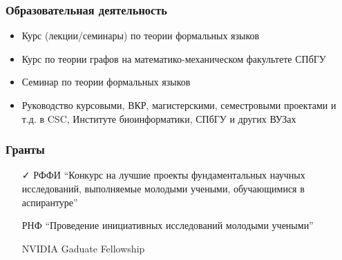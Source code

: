 \documentclass[xcolor=table]{beamer}
\begin{document}
\begin{frame}[fragile]

  \frametitle{Образовательная деятельность}
\begin{itemize}
      \item Курс (лекции/семинары) по теории формальных языков
      \item Курс по теории графов на математико-механическом факультете СПбГУ
      \item Семинар по теории формальных языков
      \item Руководство курсовыми, ВКР, магистерскими, семестровыми проектами и т.д. в CSC, Институте биоинформатики, СПбГУ и других ВУЗах
\end{itemize}
\end{frame}

\begin{frame}[fragile]

  \frametitle{Гранты}
\begin{itemize}
      \item[\faCheck] РФФИ ``Конкурс на лучшие проекты фундаментальных научных исследований, выполняемые молодыми учеными, обучающимися в аспирантуре''

      \item[\faTimes] РНФ ``Проведение инициативных исследований молодыми учеными''

      \item[\faTimes] NVIDIA Gaduate Fellowship

\end{itemize}
\end{frame}
\end{document}
